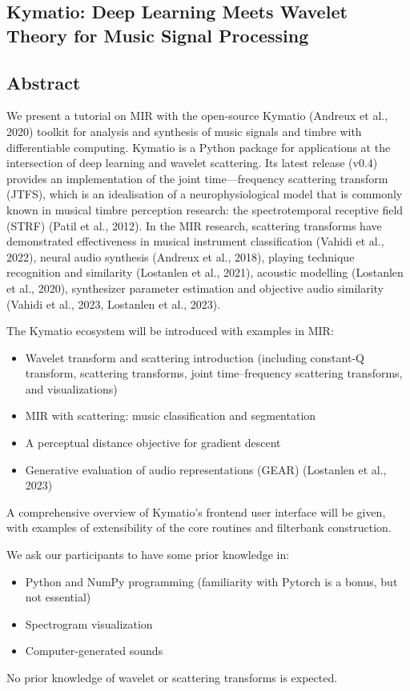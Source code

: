 \subsection*{Kymatio: Deep Learning Meets Wavelet Theory for Music Signal Processing}

\subsection*{Abstract}
We present a tutorial on MIR with the open-source Kymatio (Andreux et al., 2020) toolkit for analysis and synthesis of music signals and timbre with differentiable computing. Kymatio is a Python package for applications at the intersection of deep learning and wavelet scattering. Its latest release (v0.4) provides an implementation of the joint time—frequency scattering transform (JTFS), which is an idealisation of a neurophysiological model that is commonly known in musical timbre perception research: the spectrotemporal receptive field (STRF) (Patil et al., 2012). In the MIR research, scattering transforms have demonstrated effectiveness in musical instrument classification (Vahidi et al., 2022), neural audio synthesis (Andreux et al., 2018), playing technique recognition and similarity (Lostanlen et al., 2021), acoustic modelling (Lostanlen et al., 2020), synthesizer parameter estimation and objective audio similarity (Vahidi et al., 2023, Lostanlen et al., 2023).

The Kymatio ecosystem will be introduced with examples in MIR:
\begin{itemize}
\item Wavelet transform and scattering introduction (including constant-Q transform, scattering transforms, joint time–frequency scattering transforms, and visualizations) 
\item MIR with scattering: music classification and segmentation 
\item A perceptual distance objective for gradient descent 
\item Generative evaluation of audio representations (GEAR) (Lostanlen et al., 2023)
\end{itemize}

A comprehensive overview of Kymatio's frontend user interface will be given, with examples of extensibility of the core routines and filterbank construction.

We ask our participants to have some prior knowledge in:
\begin{itemize}
\item Python and NumPy programming (familiarity with Pytorch is a bonus, but not essential)
\item Spectrogram visualization
\item Computer-generated sounds
\end{itemize}
No prior knowledge of wavelet or scattering transforms is expected.

